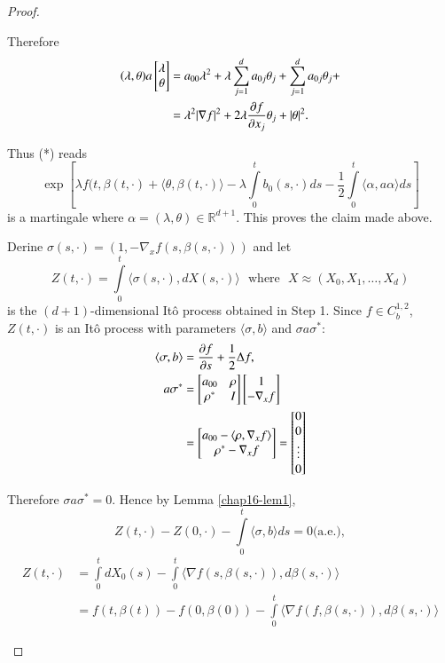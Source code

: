 \begin{proof}
\begin{step}
Therefore
\begin{align*}
(\lambda,\theta)a
\begin{bmatrix}
\lambda\\
\theta
\end{bmatrix}
&=
a_{00}\lambda^{2}+\lambda\sum\limits^{d}_{j=1}a_{0j}\theta_{j}+\sum\limits^{d}_{j=1}a_{0j}\theta_{j}+\\
&= \lambda^{2}|\nabla f|^{2}+2\lambda \frac{\partial f}{\partial
  x_{j}}\theta_{j}+|\theta|^{2}. 
\end{align*}\pageoriginale

Thus (*) reads
$$
\exp[\lambda
  f(t,\beta(t,\cdot)+\langle\theta,\beta(t,\cdot)\rangle-\lambda\int\limits^{t}_{0}b_{0}(s,\cdot)ds-\frac{1}{2}\int\limits^{t}_{0}\langle
  \alpha,a\alpha\rangle ds]
$$
is a martingale where $\alpha=(\lambda,\theta)\in
\mathbb{R}^{d+1}$. This proves the claim made above.
\end{step}

\begin{step}%
Derine $\sigma(s,\cdot)=(1,-\nabla_{x}f(s,\beta(s,\cdot)))$ and let
$$
Z(t,\cdot)=\int\limits^{t}_{0}\langle
\sigma(s,\cdot),dX(s,\cdot)\rangle\text{~ where~ } X\approx
(X_{0},X_{1},\ldots,X_{d}) 
$$
is the $(d+1)$-dimensional It\^o process obtained in Step 1. Since
$f\in C^{1,2}_{b}$, $Z(t,\cdot)$ is an It\^o process with parameters
$\langle \sigma,b\rangle$ and $\sigma a\sigma^{*}$:
\begin{align*}
\langle \sigma,b\rangle &= \frac{\partial f}{\partial s}+\frac{1}{2}\Delta f,\\
a\sigma^{*} &= 
\begin{bmatrix}
a_{00} & \rho\\
\rho^{*} & I
\end{bmatrix}
\begin{bmatrix}
1\\
-\nabla_{x}f
\end{bmatrix}\\
&= 
\begin{bmatrix}
a_{00}-\langle \rho,\nabla_{x}f\rangle\\
\rho^{*}-\nabla_{x}f
\end{bmatrix}
=
\begin{bmatrix}
0\\
0\\
\vdots\\
0
\end{bmatrix}
\end{align*}

Therefore $\sigma a\sigma^{*}=0$. Hence by Lemma \ref{chap16-lem1},
$$
Z(t,\cdot)-Z(0,\cdot)-\int\limits^{t}_{0}\langle \sigma,b\rangle
ds=0\text{(a.e.)}, 
$$
\begin{align*}
Z(t,\cdot) &= \int\limits^{t}_{0}dX_{0}(s)-\int\limits^{t}_{0}\langle
\nabla f(s,\beta(s,\cdot)),d\beta(s,\cdot)\rangle\\
&= f(t,\beta(t))-f(0,\beta(0))-\int\limits^{t}_{0}\langle \nabla f(f,\beta(s,\cdot)),d\beta(s,\cdot)\rangle
\end{align*}\pageoriginale


\end{step}
\end{proof}
